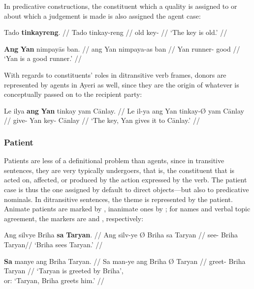 \xe

In predicative constructions, the constituent which a quality is assigned to or
about which a judgement is made is also assigned the agent case:

\pex
\a\begingl
	\gla Tado \textbf{tinkayreng}. //
	\glb Tado tinkay-reng //
	\glc old key-\AargI{} //
	\glft `The key is old.' //
\endgl

\a\begingl
	\gla \textbf{Ang} \textbf{Yan} nimpayās ban. //
	\glb ang Yan nimpaya-as ban //
	\glc \Aarg{} Yan runner-\Parg{} good //
	\glft `Yan is a good runner.' //
\endgl

\xe


With regards to constituents' roles in ditransitive verb frames, donors are 
represented by agents in Ayeri as well, since they are the origin of whatever 
is conceptually passed on to the recipient party:

\ex\begingl
	\gla Le ilya \textbf{ang} \textbf{Yan} tinkay yam Cānlay. //
	\glb Le il-ya ang Yan tinkay-Ø yam Cānlay //
	\glc \PatT{} give-\TsgM{} \Aarg{} Yan key-\Top{} \Dat{} Cānlay //
	\glft `The key, Yan gives it to Cānlay.' //
\endgl\xe

\subsubsection{Patient}

Patients are less of a definitional problem than agents, since in transitive
sentences, they are very typically undergoers, that is, the constituent that is
acted on, affected, or produced by the action expressed by the verb. The
patient case is thus the one assigned by default to direct objects---but also
to predicative nominals. In ditransitive sentences, the theme is represented by
the patient. Animate patients are marked by , inanimate ones by
; for names and verbal topic agreement, the markers are 
 and , respectively:

\pex
\a\begingl
	\gla Ang silvye {} Briha \textbf{sa} \textbf{Taryan}. //
	\glb Ang silv-ye Ø Briha sa Taryan //
	\glc \AgtT{} see-\TsgF{} \Top{} Briha \Parg{} Taryan//
	\glft `Briha sees Taryan.' //
\endgl

\a\begingl
	\gla \textbf{Sa} manye ang Briha {} Taryan. //
	\glb Sa man-ye ang Briha Ø Taryan //
	\glc \PatT{} greet-\TsgF{} \Aarg{} Briha \Top{} Taryan //
	\glft `Taryan is greeted by Briha',\\
		or: `Taryan, Briha greets him.' //
\endgl

